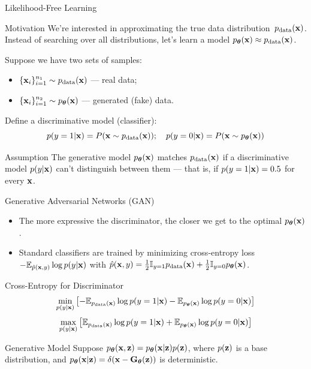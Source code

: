 \documentclass{beamer}
\begin{document}
\begin{frame}{Likelihood-Free Learning}
	\begin{block}{Motivation}
	 We're interested in approximating the true data distribution~$p_{\text{data}}(\mathbf{x})$.
	Instead of searching over all distributions, let's learn a model $p_{\boldsymbol{\theta}}(\mathbf{x}) \approx p_{\text{data}}(\mathbf{x})$.
	\end{block}
	\eqpause
	Suppose we have two sets of samples: 
	\begin{itemize}
		\item $\{\mathbf{x}_i\}_{i=1}^{n_1} \sim p_{\text{data}}(\mathbf{x})$ — real data;
		\item $\{\mathbf{x}_i\}_{i=1}^{n_2} \sim p_{\boldsymbol{\theta}}(\mathbf{x})$ — generated (fake) data.
	\end{itemize}
	\eqpause
	Define a discriminative model (classifier):
	\[
		p(y = 1 | \mathbf{x}) = P(\mathbf{x} \sim p_{\text{data}}(\mathbf{x})); \quad p(y = 0 | \mathbf{x}) = P(\mathbf{x} \sim p_{\boldsymbol{\theta}}(\mathbf{x}))
	\]
	\eqpause
	\vspace{-0.5cm}
	\begin{block}{Assumption}
		The generative model $p_{\boldsymbol{\theta}}(\mathbf{x})$ matches $p_{\text{data}}(\mathbf{x})$ if a discriminative model $p(y | \mathbf{x})$ can't distinguish between them --- that is, if $p(y = 1 | \mathbf{x}) = 0.5$ for every $\mathbf{x}$.
	\end{block}
\end{frame}
\begin{frame}{Generative Adversarial Networks (GAN)}
	\begin{itemize}
		\item The more expressive the discriminator, the closer we get to the optimal $p_{\boldsymbol{\theta}}(\mathbf{x})$.
		\item Standard classifiers are trained by minimizing cross-entropy loss $-\mathbb{E}_{\hat{p}(\mathbf{x}, y)} \log p(y | \mathbf{x})$ with $\hat{p}(\mathbf{x}, y) = \frac{1}{2} \mathbb{I}_{y=1}p_{\text{data}}(\mathbf{x}) + \frac{1}{2} \mathbb{I}_{y=0}p_{\boldsymbol{\theta}}(\mathbf{x})$.
	\end{itemize}
	\eqpause
	\begin{block}{Cross-Entropy for Discriminator}
		\vspace{-0.3cm}
		\[
			\min_{p(y | \mathbf{x})} \left[ - \mathbb{E}_{p_{\text{data}}(\mathbf{x})} \log p(y = 1 | \mathbf{x}) - \mathbb{E}_{p_{\boldsymbol{\theta}}(\mathbf{x})} \log p(y = 0 | \mathbf{x}) \right] 
		\]
		\[
			\max_{p(y | \mathbf{x})} \left[\mathbb{E}_{p_{\text{data}}(\mathbf{x})} \log p(y = 1 | \mathbf{x}) + \mathbb{E}_{p_{\boldsymbol{\theta}}(\mathbf{x})} \log p(y = 0 | \mathbf{x}) \right] 
		\]
	\end{block}
	\eqpause
	\vspace{-0.3cm}
	\begin{block}{Generative Model}
		Suppose $p_{\boldsymbol{\theta}}(\mathbf{x}, \mathbf{z}) = p_{\boldsymbol{\theta}}(\mathbf{x}| \mathbf{z}) p(\mathbf{z})$, where $p(\mathbf{z})$ is a base distribution, and $p_{\boldsymbol{\theta}}(\mathbf{x} | \mathbf{z}) = \delta (\mathbf{x} - \mathbf{G}_{\boldsymbol{\theta}}(\mathbf{z}))$ is deterministic.
	\end{block}
\end{frame}
\end{document}
